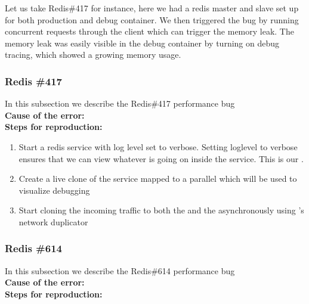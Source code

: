 Let us take Redis\#417 for instance, here we had a redis master and slave set up for both production and debug container.
We then triggered the bug by running concurrent requests through the client which can trigger the memory leak.
The memory leak was easily visible in the debug container by turning on debug tracing, which showed a growing memory usage. 


\subsubsection{Redis \#417}

In this subsection we describe the Redis\#417 performance bug \\

\noindent \textbf{Cause of the error:} \\

\noindent \textbf{Steps for reproduction:} \\

\begin{adjustwidth}{0.5cm}{}
	\begin{enumerate}
		\item Start a redis service with log level set to verbose. Setting loglevel to verbose ensures that we can view whatever is going on inside the service. This is our \productioncontainer.
		\item Create a live clone of the service mapped to a parallel \debugcontainer which will be used to visualize debugging
		\item Start cloning the incoming traffic to both the \productioncontainer and the \debugcontainer asynchronously using \parikshan's network duplicator
	\end{enumerate}
\end{adjustwidth}	


\subsubsection{Redis \#614}

In this subsection we describe the Redis\#614 performance bug \\

\noindent \textbf{Cause of the error:} \\

\noindent \textbf{Steps for reproduction:} \\

